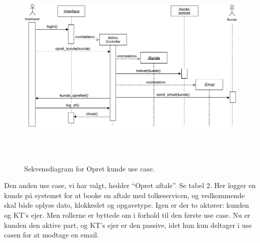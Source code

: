 \documentclass[12pt]{article}   %
\begin{document}
\begin{figure}[!ht]
\includegraphics[width=14cm, height=10cm]{seqtwo.pdf}
\caption{Sekvensdiagram for Opret kunde use case.}
\label{fig:opret}
\end{figure}

Den anden use case, vi har valgt, hedder ``Opret aftale''. Se tabel 2.  Her 
logger en kunde på systemet for at booke en aftale med tolkeservicen, og
vedkommende skal både oplyse dato, klokkeslet og opgavetype. Igen er der to
aktører: kunden og KT's ejer. Men rollerne er byttede om i forhold til den
første use case. Nu er kunden den aktive part, og KT's ejer er den passive,
idet hun kun deltager i use casen for at modtage en email.\\
\end{document}
